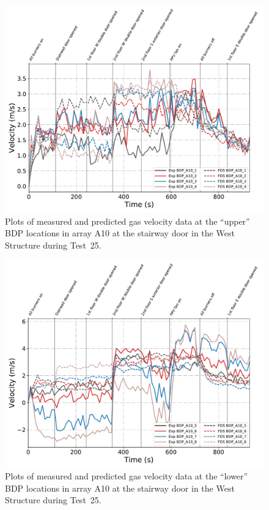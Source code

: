 \begin{figure}[!h]
	\centering
	\includegraphics[width=\columnwidth]{Figures/Plots/Validation/Velocity/Test_25_BDP_A10_upper}
	\caption[Plots of measured and predicted gas velocity data at ``upper'' BDP locations in A10 during Test~25.]{Plots of measured and predicted gas velocity data at the ``upper'' BDP locations in array A10 at the stairway door in the West Structure during Test~25.}
	\label{fig:Test25_upper_BDPs}
\end{figure}

\begin{figure}[!h]
	\centering
	\includegraphics[width=\columnwidth]{Figures/Plots/Validation/Velocity/Test_25_BDP_A10_lower}
	\caption[Plots of measured and predicted gas velocity data at ``lower'' BDP locations in A10 during Test~25.]{Plots of measured and predicted gas velocity data at the ``lower'' BDP locations in array A10 at the stairway door in the West Structure during Test~25.}
	\label{fig:Test25_lower_BDPs}
\end{figure}

